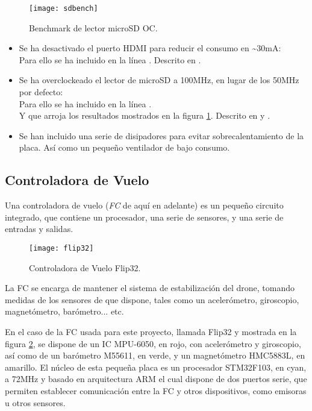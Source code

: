 \begin{figure}
	\centering
	\texttt{[image: sdbench]}
	\caption{Benchmark de lector microSD OC.}\label{fig:sdbenchmark}
\end{figure}

\begin{itemize}
\item Se ha desactivado el puerto HDMI para reducir el consumo en \textasciitilde{}30mA: \\Para ello se ha incluido en  la línea . Descrito en \citep{wiki:PowerSaving}.
\item Se ha overclockeado el lector de microSD a 100MHz, en lugar de los 50MHz por defecto: \\Para ello se ha incluido en  la línea .\\Y que arroja los resultados mostrados en la figura \ref{fig:sdbenchmark}. Descrito en \citep{wiki:OCSD} y \citep{wiki:OCSDWifiFix}.
\item Se han incluido una serie de disipadores para evitar sobrecalentamiento de la placa. Así como un pequeño ventilador de bajo consumo.
\end{itemize} 


\subsection{Controladora de Vuelo}

Una controladora de vuelo (\textit{FC} de aquí en adelante) es un pequeño circuito integrado, que contiene un procesador, una serie de sensores, y una serie de entradas y salidas. 
\begin{figure}
\centering
\texttt{[image: flip32]}
\caption{Controladora de Vuelo Flip32.}\label{fig:fc}
\end{figure}
La FC se encarga de mantener el sistema de estabilización del drone, tomando medidas de los sensores de que dispone, tales como un acelerómetro, giroscopio, magnetómetro, barómetro... etc. 

En el caso de la FC usada para este proyecto, llamada Flip32 y mostrada en la figura  \ref{fig:fc}, se dispone de un IC MPU-6050, en rojo, con acelerómetro y giroscopio, así como de un barómetro M55611, en verde, y un magnetómetro HMC5883L, en amarillo.
El núcleo de esta pequeña placa es un procesador STM32F103, en cyan, a 72MHz y basado en arquitectura ARM el cual dispone de dos puertos serie, que permiten establecer comunicación entre la FC y otros dispositivos, como emisoras u otros sensores.

